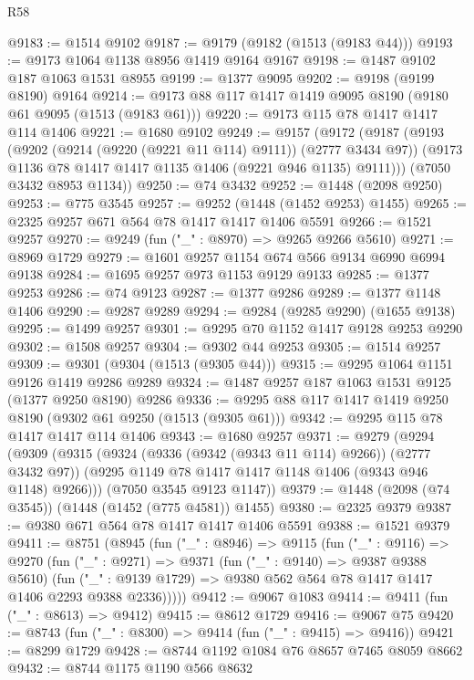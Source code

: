\begin{lexlean}{R58}
\begin{coremodule}
{{@9183 := @1514 @9102
@9187 := @9179 (@9182 (@1513 (@9183 @44)))
@9193 := @9173 @1064 @1138 @8956 @1419 @9164 @9167
@9198 := @1487 @9102 @187 @1063 @1531 @8955
@9199 := @1377 @9095
@9202 := @9198 (@9199 @8190) @9164
@9214 := @9173 @88 @117 @1417 @1419 @9095 @8190 (@9180 @61 @9095 (@1513 (@9183 @61)))
@9220 := @9173 @115 @78 @1417 @1417 @114 @1406
@9221 := @1680 @9102
@9249 := @9157
    (@9172
      (@9187
        (@9193
          (@9202 (@9214 (@9220 (@9221 @11 @114) @9111)) (@2777 @3434 @97))
          (@9173 @1136 @78 @1417 @1417 @1135 @1406 (@9221 @946 @1135) @9111)))
      (@7050 @3432 @8953 @1134))
@9250 := @74 @3432
@9252 := @1448 (@2098 @9250)
@9253 := @775 @3545
@9257 := @9252 (@1448 (@1452 @9253) @1455)
@9265 := @2325 @9257 @671 @564 @78 @1417 @1417 @1406 @5591
@9266 := @1521 @9257
@9270 := @9249 (fun ("_" : @8970) => @9265 @9266 @5610)
@9271 := @8969 @1729
@9279 := @1601 @9257 @1154 @674 @566 @9134 @6990 @6994 @9138
@9284 := @1695 @9257 @973 @1153 @9129 @9133
@9285 := @1377 @9253
@9286 := @74 @9123
@9287 := @1377 @9286
@9289 := @1377 @1148 @1406
@9290 := @9287 @9289
@9294 := @9284 (@9285 @9290) (@1655 @9138)
@9295 := @1499 @9257
@9301 := @9295 @70 @1152 @1417 @9128 @9253 @9290
@9302 := @1508 @9257
@9304 := @9302 @44 @9253
@9305 := @1514 @9257
@9309 := @9301 (@9304 (@1513 (@9305 @44)))
@9315 := @9295 @1064 @1151 @9126 @1419 @9286 @9289
@9324 := @1487 @9257 @187 @1063 @1531 @9125 (@1377 @9250 @8190) @9286
@9336 := @9295 @88 @117 @1417 @1419 @9250 @8190 (@9302 @61 @9250 (@1513 (@9305 @61)))
@9342 := @9295 @115 @78 @1417 @1417 @114 @1406
@9343 := @1680 @9257
@9371 := @9279
    (@9294
      (@9309
        (@9315
          (@9324 (@9336 (@9342 (@9343 @11 @114) @9266)) (@2777 @3432 @97))
          (@9295 @1149 @78 @1417 @1417 @1148 @1406 (@9343 @946 @1148) @9266)))
      (@7050 @3545 @9123 @1147))
@9379 := @1448 (@2098 (@74 @3545)) (@1448 (@1452 (@775 @4581)) @1455)
@9380 := @2325 @9379
@9387 := @9380 @671 @564 @78 @1417 @1417 @1406 @5591
@9388 := @1521 @9379
@9411 := @8751
    (@8945
      (fun ("_" : @8946) =>
      @9115
        (fun ("_" : @9116) =>
        @9270
          (fun ("_" : @9271) =>
          @9371
            (fun ("_" : @9140) => @9387 @9388 @5610)
            (fun ("_" : @9139 @1729) => @9380 @562 @564 @78 @1417 @1417 @1406 @2293 @9388 @2336)))))
@9412 := @9067 @1083
@9414 := @9411 (fun ("_" : @8613) => @9412)
@9415 := @8612 @1729
@9416 := @9067 @75
@9420 := @8743 (fun ("_" : @8300) => @9414 (fun ("_" : @9415) => @9416))
@9421 := @8299 @1729
@9428 := @8744 @1192 @1084 @76 @8657 @7465 @8059 @8662
@9432 := @8744 @1175 @1190 @566 @8632
}}
\end{coremodule}
\end{lexlean}
